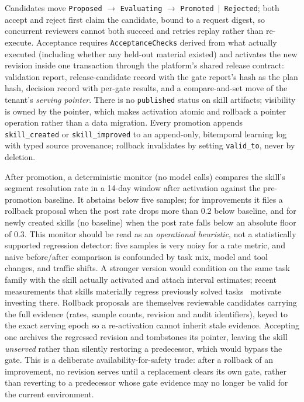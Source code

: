 \documentclass{article}
\newcommand{\code}[1]{\texttt{\small #1}}
\begin{document}
Candidates move \code{Proposed} $\to$ \code{Evaluating} $\to$ \code{Promoted}~$|$~\code{Rejected}; both accept and reject first claim the candidate, bound to a request digest, so concurrent reviewers cannot both succeed and retries replay rather than re-execute. Acceptance requires \code{AcceptanceChecks} derived from what actually executed (including whether any held-out material existed) and activates the new revision inside one transaction through the platform's shared release contract: validation report, release-candidate record with the gate report's hash as the plan hash, decision record with per-gate results, and a compare-and-set move of the tenant's \emph{serving pointer}. There is no \code{published} status on skill artifacts; visibility is owned by the pointer, which makes activation atomic and rollback a pointer operation rather than a data migration. Every promotion appends \code{skill\_created} or \code{skill\_improved} to an append-only, bitemporal learning log with typed source provenance; rollback invalidates by setting \code{valid\_to}, never by deletion.

After promotion, a deterministic monitor (no model calls) compares the skill's segment resolution rate in a 14-day window after activation against the pre-promotion baseline. It abstains below five samples; for improvements it files a rollback proposal when the post rate drops more than $0.2$ below baseline, and for newly created skills (no baseline) when the post rate falls below an absolute floor of $0.3$. This monitor should be read as an \emph{operational heuristic}, not a statistically supported regression detector: five samples is very noisy for a rate metric, and naive before/after comparison is confounded by task mix, model and tool changes, and traffic shifts. A stronger version would condition on the same task family with the skill actually activated and attach interval estimates; recent measurements that skills materially regress previously solved tasks~\citep{tank2026regressiontax} motivate investing there. Rollback proposals are themselves reviewable candidates carrying the full evidence (rates, sample counts, revision and audit identifiers), keyed to the exact serving epoch so a re-activation cannot inherit stale evidence. Accepting one archives the regressed revision and tombstones its pointer, leaving the skill \emph{unserved} rather than silently restoring a predecessor, which would bypass the gate. This is a deliberate availability-for-safety trade: after a rollback of an improvement, no revision serves until a replacement clears its own gate, rather than reverting to a predecessor whose gate evidence may no longer be valid for the current environment.
\end{document}
